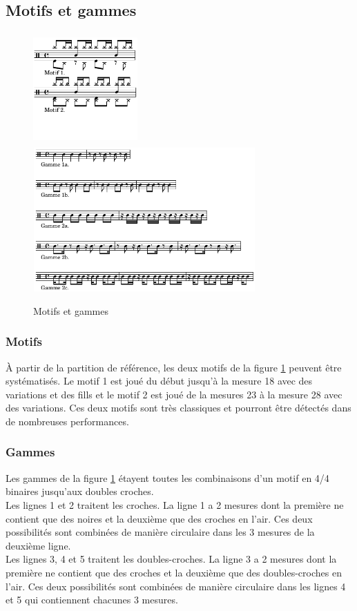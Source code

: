 \subsection*{Motifs et gammes}
\begin{figure}[h]
	\centering
	\includegraphics[height=43mm, width=40mm]{z_images/4_experimentations/2_experimentation_theorique/0_motifs_4-4_binaires.png}
	\includegraphics[height=55mm, width=85mm]{z_images/4_experimentations/2_experimentation_theorique/1_gammes_4-4_binaires.png}
	\caption{Motifs et gammes}
	\label{motifs_gammes}
\end{figure}
\subsubsection{Motifs}
À partir de la partition de référence, les deux motifs de la figure \ref{motifs_gammes} peuvent être systématisés. Le motif 1 est joué du début jusqu’à la mesure 18 avec des variations et des fills et le motif 2 est joué de la mesures 23 à la mesure 28 avec des variations. Ces deux motifs sont très classiques et pourront être détectés dans de nombreuses performances.\\
\subsubsection{Gammes}
Les gammes de la figure \ref{motifs_gammes} étayent toutes les combinaisons d’un motif en 4/4 binaires jusqu’aux doubles croches.\\
Les lignes 1 et 2 traitent les croches. La ligne 1 a 2 mesures dont la première ne contient que des noires et la deuxième que des croches en l’air. Ces deux possibilités sont combinées de manière circulaire dans les 3 mesures de la deuxième ligne.\\
Les lignes 3, 4 et 5 traitent les doubles-croches. La ligne 3 a 2 mesures dont la première ne contient que des croches et la deuxième que des doubles-croches en l’air. Ces deux possibilités sont combinées de manière circulaire dans les lignes 4 et 5 qui contiennent chacunes 3 mesures.
